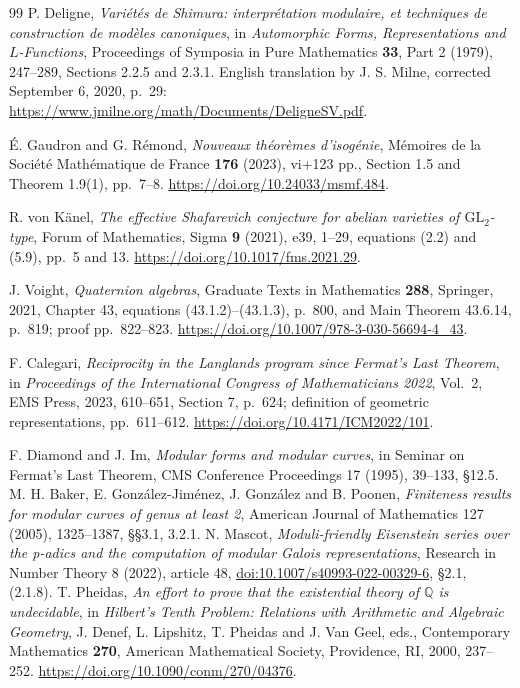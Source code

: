 \documentclass[11pt]{article}
\theoremstyle{definition}
\theoremstyle{remark}
\newcommand{\Q}{\mathbb Q}
\begin{document}
\begin{thebibliography}{99}
 P. Deligne,
\emph{Vari\'et\'es de Shimura: interpr\'etation modulaire, et techniques
de construction de mod\`eles canoniques},
in \emph{Automorphic Forms, Representations and $L$-Functions},
Proceedings of Symposia in Pure Mathematics \textbf{33}, Part 2 (1979),
247--289, Sections 2.2.5 and 2.3.1.
English translation by J. S. Milne, corrected September 6, 2020, p.~29:
\url{https://www.jmilne.org/math/Documents/DeligneSV.pdf}.

 \'E. Gaudron and G. R\'emond,
\emph{Nouveaux th\'eor\`emes d'isog\'enie},
M\'emoires de la Soci\'et\'e Math\'ematique de France \textbf{176} (2023),
vi+123 pp., Section 1.5 and Theorem 1.9(1), pp.~7--8.
\url{https://doi.org/10.24033/msmf.484}.

 R. von K\"anel,
\emph{The effective Shafarevich conjecture for abelian varieties of
$\mathrm{GL}_2$-type}, Forum of Mathematics, Sigma \textbf{9} (2021), e39,
1--29, equations (2.2) and (5.9), pp.~5 and 13.
\url{https://doi.org/10.1017/fms.2021.29}.

 J. Voight, \emph{Quaternion algebras},
Graduate Texts in Mathematics \textbf{288}, Springer, 2021,
Chapter 43, equations (43.1.2)--(43.1.3), p.~800, and
Main Theorem 43.6.14, p.~819; proof pp.~822--823.
\url{https://doi.org/10.1007/978-3-030-56694-4_43}.

 F. Calegari,
\emph{Reciprocity in the Langlands program since Fermat's Last Theorem},
in \emph{Proceedings of the International Congress of Mathematicians 2022},
Vol.~2, EMS Press, 2023, 610--651, Section 7, p.~624;
definition of geometric representations, pp.~611--612.
\url{https://doi.org/10.4171/ICM2022/101}.

 F. Diamond and J. Im,
\emph{Modular forms and modular curves}, in Seminar on Fermat's Last Theorem,
CMS Conference Proceedings 17 (1995), 39--133, \S12.5.
 M. H. Baker, E. Gonz\'alez-Jim\'enez,
J. Gonz\'alez and B. Poonen, \emph{Finiteness results for modular curves
of genus at least 2}, American Journal of Mathematics 127 (2005),
1325--1387, \S\S3.1, 3.2.1.
 N. Mascot, \emph{Moduli-friendly Eisenstein series
over the p-adics and the computation of modular Galois representations},
Research in Number Theory 8 (2022), article 48,
\href{https://doi.org/10.1007/s40993-022-00329-6}{doi:10.1007/s40993-022-00329-6},
\S2.1, (2.1.8).
 T. Pheidas,
\emph{An effort to prove that the existential theory of $\Q$ is undecidable},
in \emph{Hilbert's Tenth Problem: Relations with Arithmetic and Algebraic Geometry},
J. Denef, L. Lipshitz, T. Pheidas and J. Van Geel, eds.,
Contemporary Mathematics \textbf{270}, American Mathematical Society,
Providence, RI, 2000, 237--252.
\url{https://doi.org/10.1090/conm/270/04376}.
\end{thebibliography}
\end{document}
